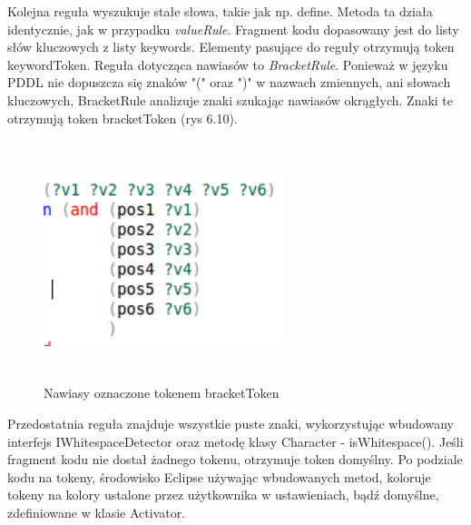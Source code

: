 Kolejna reguła wyszukuje stałe słowa, takie jak np. define. Metoda ta działa identycznie, jak w przypadku \emph{valueRule}. Fragment kodu dopasowany jest do listy słów kluczowych z listy keywords. Elementy pasujące do reguły otrzymują token keywordToken. Reguła dotycząca nawiasów to \emph{BracketRule}. Ponieważ w języku PDDL nie dopuszcza się znaków "(" oraz ")" w nazwach zmiennych, ani słowach kluczowych, BracketRule analizuje znaki szukając nawiasów okrągłych. Znaki te otrzymują token bracketToken (rys 6.10).

\begin{figure}[h]
  \centering
    \includegraphics[width=7cm,height=7cm,keepaspectratio]{img/bracket-color.png}
    \caption{Nawiasy oznaczone tokenem bracketToken}
    \label{ana_structure}
\end{figure}

Przedostatnia reguła znajduje wszystkie puste znaki, wykorzystując wbudowany interfejs  IWhitespaceDetector oraz metodę klasy Character - isWhitespace(). Jeśli fragment kodu nie dostał żadnego tokenu, otrzymuje token domyślny.  Po podziale kodu na tokeny, środowisko Eclipse używając wbudowanych metod, koloruje tokeny na kolory ustalone przez użytkownika w ustawieniach, bądź domyślne, zdefiniowane w klasie Activator.
